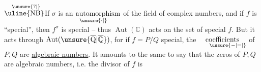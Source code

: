 \(\overset{\hspace{0.55em}\unsure{?|}}{\text{\uline{NB}}}\)\quad If $\sigma$ is an $\underset{\hspace{-1.3em}\unsure{\cdot|}}{\text{automorphism}}$ of the field of complex numbers, and if $f$ is ``special'', then $f^\sigma$ is  special -- thus $\operatorname{Aut}(\mathbb C)$ acts on the set of special $f$. But it acts through $\operatorname{Aut}(\unsure{\overline{\mathrm Q}|\overline{\mathbb Q}})$, for if $f=P/Q$ special, the $\underset{\hspace{1.5em}\unsure{-|=|}}{\text{coefficients}}$ of $P,Q$ are \uline{algebraic numbers}. It amounts to the same to say that the zeros of $P,Q$ are algebraic numbers, i.e. the divisor of $f$ is

